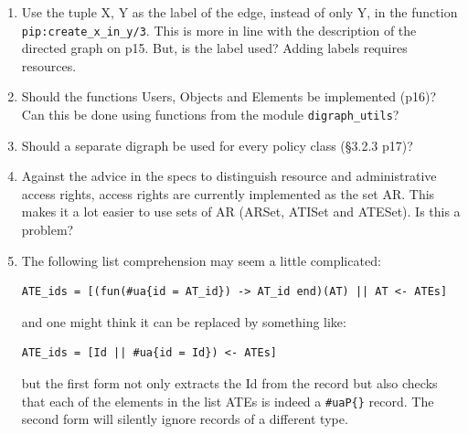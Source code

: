 \documentclass[12pt,a4paper,titlepage]{book}
\begin{document}
	\begin{enumerate}

		\item Use the tuple {X, Y} as the label of the edge, instead of only Y, in the function \lstinline|pip:create_x_in_y/3|. This is more in line with the description of the directed graph on p15. But, is the label used? Adding labels requires resources.
		
		\item Should the functions Users, Objects and Elements be implemented (p16)? Can this be done using functions from the module \lstinline|digraph_utils|?
		
		\item Should a separate digraph be used for every policy class (\S 3.2.3 p17)?
		
		\item Against the advice in the specs to distinguish resource and administrative access rights, access rights are currently implemented as the set AR. This makes it a lot easier to use sets of AR (ARSet, ATISet and ATESet). Is this a problem?
		
		\item The following list comprehension may seem a little complicated:

		\begin{lstlisting}[basicstyle=\footnotesize, breaklines=false]
ATE_ids = [(fun(#ua{id = AT_id}) -> AT_id end)(AT) || AT <- ATEs]\end{lstlisting}

		 and one might think it can be replaced by something like:

		\begin{lstlisting}[basicstyle=\footnotesize, breaklines=false]
ATE_ids = [Id || #ua{id = Id}) <- ATEs]\end{lstlisting}

		 but the first form not only extracts the Id from the record but also checks that each of the elements in the list ATEs is indeed a \lstinline|#uaP{}| record. The second form will silently ignore records of a different type.

	\end{enumerate}
	
	
	
\end{document}
